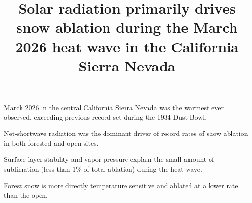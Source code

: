 \documentclass[draft]{agujournal2019}
\begin{document}
\title{Solar radiation primarily drives snow ablation during the March 2026 heat wave in the California Sierra Nevada}






\begin{keypoints}
\item March 2026 in the central California Sierra Nevada was the warmest ever observed, exceeding previous record set during the 1934 Dust Bowl. 
\item Net-shortwave radiation was the dominant driver of record rates of snow ablation in both forested and open sites. 
\item Surface layer stability and vapor pressure explain the small amount of sublimation (less than 1\% of total ablation) during the heat wave.
\item Forest snow is more directly temperature sensitive and ablated at a lower rate than the open.

\end{keypoints}
\end{document}
